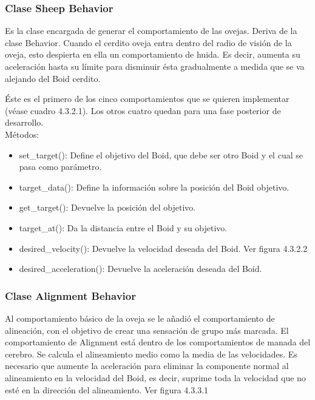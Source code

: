 \subsubsection{Clase Sheep Behavior}
\label{subsubsection:sheep_behavior}

Es la clase encargada de generar el comportamiento de las ovejas. Deriva de la clase Behavior. Cuando el cerdito oveja entra dentro del 
radio de visión de la oveja, esto despierta en ella un comportamiento de huida. Es decir, aumenta su aceleración hasta su límite para 
disminuir ésta gradualmente a medida que se va alejando del Boid cerdito.

Éste es el primero de los cinco comportamientos que se quieren implementar (véase cuadro 4.3.2.1). Los otros cuatro quedan para una fase 
posterior de desarrollo.\\

Métodos:
\begin{itemize}
\item set\_target():
Define el objetivo del Boid, que debe ser otro Boid y el cual se pasa como parámetro.

\item target\_data():
Define la información sobre la posición del Boid objetivo.

\item get\_target():
Devuelve la posición del objetivo.

\item target\_at():
Da la distancia entre el Boid y su objetivo.

\item desired\_velocity():
Devuelve la velocidad deseada del Boid. Ver figura 4.3.2.2

\item desired\_acceleration():
Devuelve la aceleración deseada del Boid.
\end{itemize}


\subsubsection{Clase Alignment Behavior}
\label{subsubsection:alignment_behavior}

Al comportamiento básico de la oveja se le añadió el comportamiento de alineación, con el objetivo de crear una sensación de grupo más 
marcada. El comportamiento de Alignment está dentro de los comportamientos de manada del cerebro.
Se calcula el alineamiento medio como la media de las velocidades. Es necesario que aumente la aceleración para eliminar la componente 
normal al alineamiento en la velocidad del Boid, es decir, suprime toda la velocidad que no esté en la dirección del alineamiento. 
Ver figura 4.3.3.1\\




